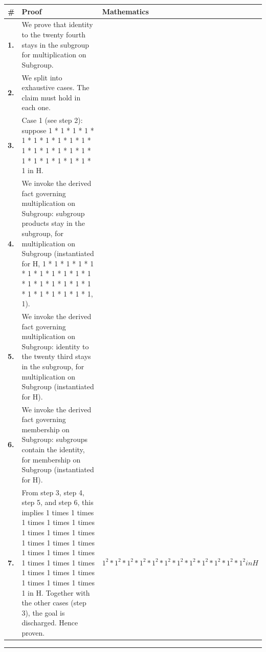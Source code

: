 \documentclass[11pt]{article}
\theoremstyle{definition}
\begin{document}
\begin{tabular}{@{} >{\raggedright\arraybackslash}p{} >{\raggedright\arraybackslash}p{} >{\raggedleft\arraybackslash}p{} @{}}
\textbf{\#} & \textbf{Proof} & \textbf{Mathematics} \\
\midrule
\textbf{1.} & We prove that identity to the twenty fourth stays in the subgroup for multiplication on Subgroup. & \\[0.45em]
\textbf{2.} & We split into exhaustive cases. The claim must hold in each one. & \\[0.45em]
\textbf{3.} & Case 1 (see step 2): suppose 1 * 1 * 1 * 1 * 1 * 1 * 1 * 1 * 1 * 1 * 1 * 1 * 1 * 1 * 1 * 1 * 1 * 1 * 1 * 1 * 1 * 1 * 1 in H. & \\[0.45em]
\textbf{4.} & We invoke the derived fact governing multiplication on Subgroup: subgroup products stay in the subgroup, for multiplication on Subgroup (instantiated for H, 1 * 1 * 1 * 1 * 1 * 1 * 1 * 1 * 1 * 1 * 1 * 1 * 1 * 1 * 1 * 1 * 1 * 1 * 1 * 1 * 1 * 1 * 1, 1). & \\[0.45em]
\textbf{5.} & We invoke the derived fact governing multiplication on Subgroup: identity to the twenty third stays in the subgroup, for multiplication on Subgroup (instantiated for H). & \\[0.45em]
\textbf{6.} & We invoke the derived fact governing membership on Subgroup: subgroups contain the identity, for membership on Subgroup (instantiated for H). & \\[0.45em]
\textbf{7.} & From step 3, step 4, step 5, and step 6, this implies 1 times 1 times 1 times 1 times 1 times 1 times 1 times 1 times 1 times 1 times 1 times 1 times 1 times 1 times 1 times 1 times 1 times 1 times 1 times 1 times 1 times 1 times 1 times 1 in H. Together with the other cases (step 3), the goal is discharged. Hence proven. & $\displaystyle 1^{2} * 1^{2} * 1^{2} * 1^{2} * 1^{2} * 1^{2} * 1^{2} * 1^{2} * 1^{2} * 1^{2} * 1^{2} * 1^{2} in H$ \\[0.45em]
\bottomrule
\end{tabular}
\label{thm:Subgroup-multiplication-identity_to_the_twenty_fourth_stays_in_the_subgroup}
\par\medskip\hrule
\end{document}
